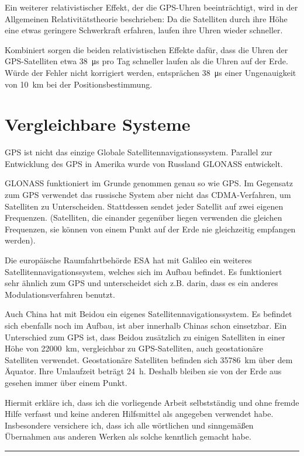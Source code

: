 \documentclass[12pt,a4paper]{scrartcl}
\begin{document}
Ein weiterer relativistischer Effekt, der die GPS-Uhren beeinträchtigt, wird in der Allgemeinen Relativitätstheorie beschrieben: Da die Satelliten durch ihre Höhe eine etwas geringere Schwerkraft erfahren, laufen ihre Uhren wieder schneller.

Kombiniert sorgen die beiden relativistischen Effekte dafür, dass die Uhren der GPS-Satelliten etwa \SI{38}{\micro\second} pro Tag schneller laufen als die Uhren auf der Erde. Würde der Fehler nicht korrigiert werden, entsprächen \SI{38}{\micro\second} einer Ungenauigkeit von \SI{10}{\kilo\meter} bei der Positionsbestimmung. \cite{ohio_gpsrelativity}

\section{Vergleichbare Systeme}
GPS ist nicht das einzige Globale Satellitennavigationssystem. Parallel zur Entwicklung des GPS in Amerika wurde von Russland GLONASS entwickelt.

GLONASS funktioniert im Grunde genommen genau so wie GPS. Im Gegensatz zum GPS verwendet das russische System aber nicht das CDMA-Verfahren, um Satelliten zu Unterscheiden. Stattdessen sendet jeder Satellit auf zwei eigenen Frequenzen. (Satelliten, die einander gegenüber liegen verwenden die gleichen Frequenzen, sie können von einem Punkt auf der Erde nie gleichzeitig empfangen werden).

Die europäische Raumfahrtbehörde ESA hat mit Galileo ein weiteres Satellitennavigationssystem, welches sich im Aufbau befindet. Es funktioniert sehr ähnlich zum GPS und unterscheidet sich z.B. darin, dass es ein anderes Modulationsverfahren benutzt.

Auch China hat mit Beidou ein eigenes Satellitennavigationssystem. Es befindet sich ebenfalls noch im Aufbau, ist aber innerhalb Chinas schon einsetzbar. Ein Unterschied zum GPS ist, dass Beidou zusätzlich zu einigen Satelliten in einer Höhe von \SI{22000}{\kilo\meter}, vergleichbar zu GPS-Satelliten, auch geostationäre Satelliten verwendet. Geostationäre Satelliten befinden sich \SI{35786}{\kilo\meter} über dem Äquator. Ihre Umlaufzeit beträgt \SI{24}{\hour}. Deshalb bleiben sie von der Erde aus gesehen immer über einem Punkt. 
\newpage
\printbibliography

\vspace{2cm}
Hiermit erkläre ich, dass ich die vorliegende Arbeit selbstständig und ohne fremde Hilfe verfasst und keine anderen Hilfsmittel als angegeben verwendet habe. Insbesondere versichere ich, dass ich alle wörtlichen und sinngemäßen Übernahmen aus anderen Werken als solche kenntlich gemacht habe.
\vspace{2cm}
\hrule
\end{document}
